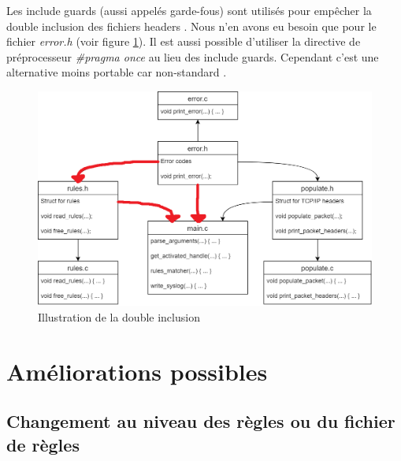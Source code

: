 \documentclass[a4paper]{article}
\begin{document}
Les include guards (aussi appelés garde-fous) sont utilisés pour empêcher la double inclusion des fichiers headers \cite{11}. Nous n'en avons eu besoin que pour le fichier \textit{error.h} (voir figure \ref{fig:doubleinclusion}). Il est aussi possible d'utiliser la directive de préprocesseur \textit{\#pragma once} au lieu des include guards. Cependant c'est une alternative moins portable car non-standard  \cite{10}.

\begin{figure}[H]
    \centering
    \includegraphics[width=0.80\linewidth]{images/double-include.png}
    \caption{Illustration de la double inclusion}
    \label{fig:doubleinclusion}
\end{figure}










\section{Améliorations possibles}





\subsection{Changement au niveau des règles ou du fichier de règles}
\end{document}
